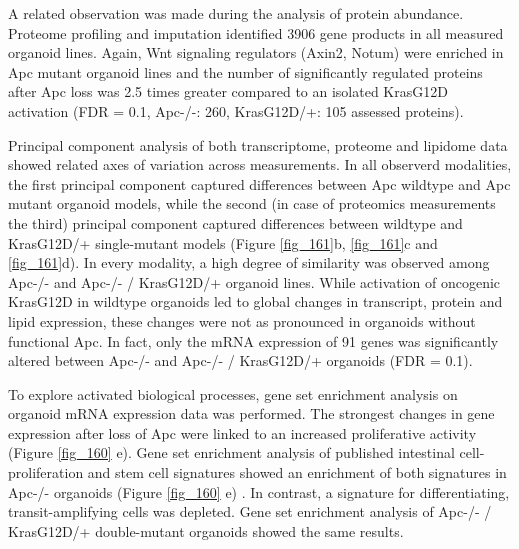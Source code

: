 \begin{flushleft}
A related observation was made during the analysis of protein abundance. Proteome profiling and imputation identified 3906 gene products in all measured organoid lines. Again, Wnt signaling regulators (Axin2, Notum) were enriched in Apc mutant organoid lines and the number of significantly regulated proteins after Apc loss was 2.5 times greater compared to an isolated KrasG12D activation (FDR = 0.1, Apc-/-: 260, KrasG12D/+: 105 assessed proteins). 

\smallbreak
Principal component analysis of both transcriptome, proteome and lipidome data showed related axes of variation across measurements. In all observerd modalities, the first principal component captured differences between Apc wildtype and Apc mutant organoid models, while the second (in case of proteomics measurements the third) principal component captured differences between wildtype and KrasG12D/+ single-mutant models (Figure \ref{fig_161}b, \ref{fig_161}c and \ref{fig_161}d). In every modality, a high degree of similarity was observed among Apc-/- and Apc-/- / KrasG12D/+ organoid lines. While activation of oncogenic KrasG12D in wildtype organoids led to global changes in transcript, protein and lipid expression, these changes were not as pronounced in organoids without functional Apc. In fact, only the mRNA expression of 91 genes was significantly altered between Apc-/- and Apc-/- / KrasG12D/+ organoids (FDR = 0.1). 

\smallbreak
To explore activated biological processes, gene set enrichment analysis on organoid mRNA expression data was performed. The strongest changes in gene expression after loss of Apc were linked to an increased proliferative activity (Figure \ref{fig_160} e). Gene set enrichment analysis of published intestinal cell-proliferation and stem cell signatures showed an enrichment of both signatures in Apc-/- organoids (Figure \ref{fig_160} e) \cite{Merlos-Suarez2011-gd}. In contrast, a signature for differentiating, transit-amplifying cells was depleted. Gene set enrichment analysis of Apc-/- / KrasG12D/+ double-mutant organoids showed the same results. 


\end{flushleft}
